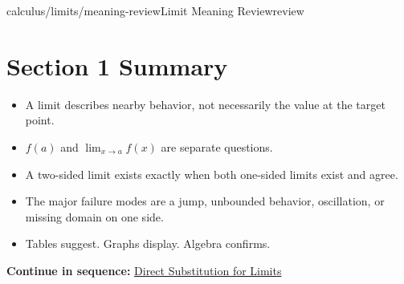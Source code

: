 \documentclass[11pt,openany]{book}
\theoremstyle{bgplain}
\newcommand{\webnext}[2]{%
  \par\addvspace{1.2em}\noindent{\color{BGLine}\rule{\textwidth}{0.35pt}}\par\smallskip
  {\small\color{BGGray}\textbf{Continue in sequence:} \hyperlink{web:#1}{#2}}\par
}
\begin{document}
\begin{webpage}{calculus/limits/meaning-review}{Limit Meaning Review}{review}
\section*{Section 1 Summary}

\begin{bgsummary}
\begin{itemize}
  \item A limit describes nearby behavior, not necessarily the value at the target point.
  \item \(f(a)\) and \(\lim_{x\to a}f(x)\) are separate questions.
  \item A two-sided limit exists exactly when both one-sided limits exist and agree.
  \item The major failure modes are a jump, unbounded behavior, oscillation, or missing domain on one side.
  \item Tables suggest. Graphs display. Algebra confirms.
\end{itemize}
\end{bgsummary}
\webnext{calculus/limits/direct-substitution}{Direct Substitution for Limits}
\end{webpage}
\end{document}
